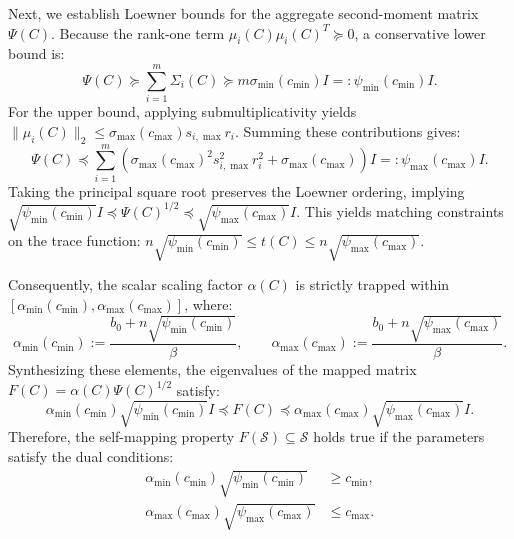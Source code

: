 \documentclass[11pt,a4paper]{article}
\begin{document}
Next, we establish Loewner bounds for the aggregate second-moment matrix $\Psi(C)$. Because the rank-one term $\mu_i(C)\mu_i(C)^T \succeq 0$, a conservative lower bound is:
\begin{equation}
\Psi(C) \succeq \sum_{i=1}^m \Sigma_i(C) \succeq m \sigma_{\min}(c_{\min})I =: \psi_{\min}(c_{\min})I.
\end{equation}
For the upper bound, applying submultiplicativity yields $\|\mu_i(C)\|_2 \le \sigma_{\max}(c_{\max}) s_{i,\max} r_i$. Summing these contributions gives:
\begin{equation}
\Psi(C) \preceq \sum_{i=1}^m \left( \sigma_{\max}(c_{\max})^2 s_{i,\max}^2 r_i^2 + \sigma_{\max}(c_{\max}) \right)I =: \psi_{\max}(c_{\max})I.
\end{equation}
Taking the principal square root preserves the Loewner ordering, implying $\sqrt{\psi_{\min}(c_{\min})}I \preceq \Psi(C)^{1/2} \preceq \sqrt{\psi_{\max}(c_{\max})}I$. This yields matching constraints on the trace function: $n\sqrt{\psi_{\min}(c_{\min})} \le t(C) \le n\sqrt{\psi_{\max}(c_{\max})}$.

Consequently, the scalar scaling factor $\alpha(C)$ is strictly trapped within $[\alpha_{\min}(c_{\min}), \alpha_{\max}(c_{\max})]$, where:
\begin{equation}
\alpha_{\min}(c_{\min}) := \frac{b_0 + n\sqrt{\psi_{\min}(c_{\min})}}{\beta}, \qquad \alpha_{\max}(c_{\max}) := \frac{b_0 + n\sqrt{\psi_{\max}(c_{\max})}}{\beta}.
\end{equation}
Synthesizing these elements, the eigenvalues of the mapped matrix $F(C) = \alpha(C)\Psi(C)^{1/2}$ satisfy:
\begin{equation}
\alpha_{\min}(c_{\min})\sqrt{\psi_{\min}(c_{\min})}I \preceq F(C) \preceq \alpha_{\max}(c_{\max})\sqrt{\psi_{\max}(c_{\max})}I.
\end{equation}
Therefore, the self-mapping property $F(\mathcal{S}) \subseteq \mathcal{S}$ holds true if the parameters satisfy the dual conditions:
\begin{align}\label{eq:self-mapping-conds}
\alpha_{\min}(c_{\min})\sqrt{\psi_{\min}(c_{\min})} &\ge c_{\min}, \\
\alpha_{\max}(c_{\max})\sqrt{\psi_{\max}(c_{\max})} &\le c_{\max}.
\end{align}
\end{document}
